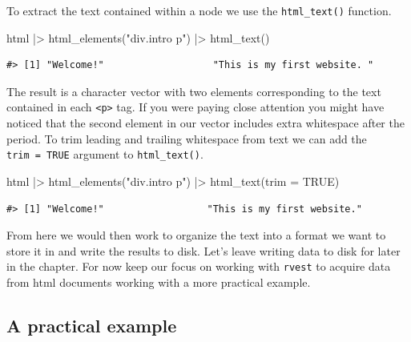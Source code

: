 \documentclass[
  letterpaper,
]{scrbook}
\newenvironment{Shaded}{\begin{snugshade}}{\end{snugshade}}
\newcommand{\AttributeTok}[1]{\textcolor[rgb]{0.00,0.00,0.00}{#1}}
\newcommand{\ConstantTok}[1]{\textcolor[rgb]{0.00,0.00,0.00}{#1}}
\newcommand{\FunctionTok}[1]{\textcolor[rgb]{0.00,0.00,0.00}{#1}}
\newcommand{\NormalTok}[1]{\textcolor[rgb]{0.00,0.00,0.00}{#1}}
\newcommand{\SpecialCharTok}[1]{\textcolor[rgb]{0.00,0.00,0.00}{#1}}
\newcommand{\StringTok}[1]{\textcolor[rgb]{0.00,0.00,0.00}{#1}}
\begin{document}
To extract the text contained within a node we use the
\texttt{html\_text()} function.

\begin{Shaded}
\begin{Highlighting}[]
\NormalTok{html }\SpecialCharTok{|\textgreater{}} 
  \FunctionTok{html\_elements}\NormalTok{(}\StringTok{"div.intro p"}\NormalTok{) }\SpecialCharTok{|\textgreater{}} 
  \FunctionTok{html\_text}\NormalTok{()}
\end{Highlighting}
\end{Shaded}

\begin{verbatim}
#> [1] "Welcome!"                   "This is my first website. "
\end{verbatim}

The result is a character vector with two elements corresponding to the
text contained in each \texttt{\textless{}p\textgreater{}} tag. If you
were paying close attention you might have noticed that the second
element in our vector includes extra whitespace after the period. To
trim leading and trailing whitespace from text we can add the
\texttt{trim\ =\ TRUE} argument to \texttt{html\_text()}.

\begin{Shaded}
\begin{Highlighting}[]
\NormalTok{html }\SpecialCharTok{|\textgreater{}} 
  \FunctionTok{html\_elements}\NormalTok{(}\StringTok{"div.intro p"}\NormalTok{) }\SpecialCharTok{|\textgreater{}} 
  \FunctionTok{html\_text}\NormalTok{(}\AttributeTok{trim =} \ConstantTok{TRUE}\NormalTok{)}
\end{Highlighting}
\end{Shaded}

\begin{verbatim}
#> [1] "Welcome!"                  "This is my first website."
\end{verbatim}

From here we would then work to organize the text into a format we want
to store it in and write the results to disk. Let's leave writing data
to disk for later in the chapter. For now keep our focus on working with
\texttt{rvest} to acquire data from html documents working with a more
practical example.

\hypertarget{a-practical-example}{%
\subsection{A practical example}\label{a-practical-example}}
\end{document}
